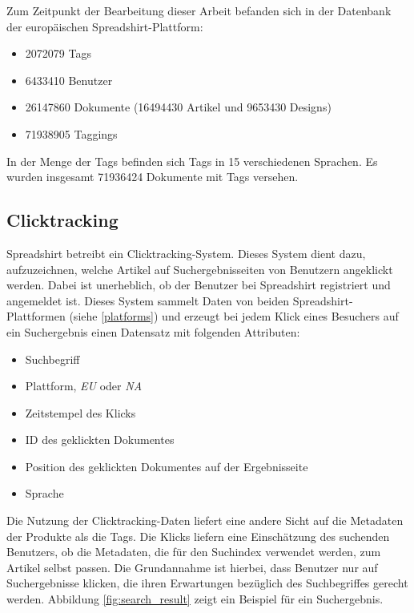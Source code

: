 Zum Zeitpunkt der Bearbeitung dieser Arbeit befanden sich in der Datenbank der europäischen Spreadshirt-Plattform:

\begin{itemize}
    \item \num{2072079} Tags
    \item \num{6433410} Benutzer
    \item \num{26147860} Dokumente (\num{16494430} Artikel und \num{9653430} Designs)
    \item \num{71938905} Taggings
\end{itemize}

In der Menge der Tags befinden sich Tags in \num{15} verschiedenen Sprachen. Es wurden insgesamt \num{71936424} Dokumente mit Tags versehen.

\subsection{Clicktracking}
Spreadshirt betreibt ein Clicktracking-System. Dieses System dient dazu, aufzuzeichnen, welche Artikel auf Suchergebnisseiten von Benutzern angeklickt werden. Dabei ist unerheblich, ob der Benutzer bei Spreadshirt registriert und angemeldet ist. Dieses System sammelt Daten von beiden Spreadshirt-Plattformen (siehe \ref{platforms}) und erzeugt bei jedem Klick eines Besuchers auf ein Suchergebnis einen Datensatz mit folgenden Attributen:

\begin{itemize}
    \item Suchbegriff
    \item Plattform, \emph{EU} oder \emph{NA}
    \item Zeitstempel des Klicks
    \item ID des geklickten Dokumentes
    \item Position des geklickten Dokumentes auf der Ergebnisseite
    \item Sprache
\end{itemize}

Die Nutzung der Clicktracking-Daten liefert eine andere Sicht auf die Metadaten der Produkte als die Tags. Die Klicks liefern eine Einschätzung des suchenden Benutzers, ob die Metadaten, die für den Suchindex verwendet werden, zum Artikel selbst passen. Die Grundannahme ist hierbei, dass Benutzer nur auf Suchergebnisse klicken, die ihren Erwartungen bezüglich des Suchbegriffes gerecht werden. Abbildung \ref{fig:search_result} zeigt ein Beispiel für ein Suchergebnis.

